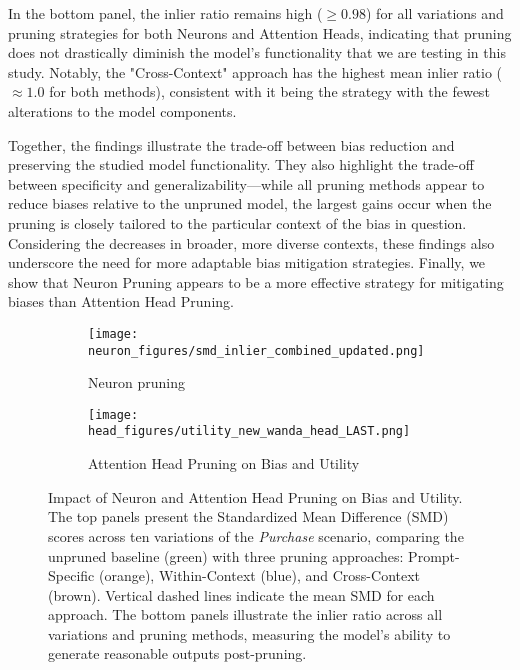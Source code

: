 In the bottom panel, the inlier ratio remains high ($\geq 0.98$) for all variations and pruning strategies for both Neurons and Attention Heads, indicating that pruning does not drastically diminish the model's functionality that we are testing in this study. Notably, the "Cross-Context" approach has the highest mean inlier ratio ($\approx1.0$ for both methods), consistent with it being the strategy with the fewest alterations to the model components.

Together, the findings illustrate the trade-off between bias reduction and preserving the studied model functionality. They also highlight the trade-off between specificity and generalizability—while all pruning methods appear to reduce biases relative to the unpruned model, the largest gains occur when the pruning is closely tailored to the particular context of the bias in question. Considering the decreases in broader, more diverse contexts, these findings also underscore the need for more adaptable bias mitigation strategies. Finally, we show that Neuron Pruning appears to be a more effective strategy for mitigating biases than Attention Head Pruning.



\begin{figure}[t]
  \centering
  \begin{subfigure}[b]{0.49\textwidth}
    \centering
    \texttt{[image: neuron\_figures/smd\_inlier\_combined\_updated.png]}
    \caption{Neuron pruning}
    \label{fig:sub-neuron}
  \end{subfigure}
  \hspace{0.02\textwidth}
  \begin{subfigure}[b]{0.47\textwidth}
      \centering
      \texttt{[image: head\_figures/utility\_new\_wanda\_head\_LAST.png]}
      \caption{Attention Head Pruning on Bias and Utility}
      \label{fig:sub-head}
  \end{subfigure}
  
  \caption{Impact of Neuron and Attention Head Pruning on Bias and Utility. The top panels present the Standardized Mean Difference (SMD) scores across ten variations of the \textit{Purchase} scenario, comparing the unpruned baseline (green) with three pruning approaches: Prompt-Specific (orange), Within-Context (blue), and Cross-Context (brown). Vertical dashed lines indicate the mean SMD for each approach. The bottom panels illustrate the inlier ratio across all variations and pruning methods, measuring the model's ability to generate reasonable outputs post-pruning.}
  \label{fig-neuron-scatter}
\end{figure}


